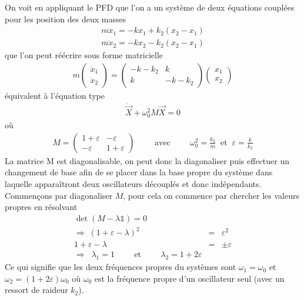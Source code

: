 \documentclass[12pt,prb,aps,epsf]{article}
\begin{document}
On voit en appliquant le PFD que l'on a un système de deux équations couplées pour les position des deux masses
\begin{eqnarray}
m\ddot{x}_1 = -kx_1 + k_2(x_2-x_1)\\
m\ddot{x}_2 = -kx_2 - k_2(x_2-x_1)
\end{eqnarray}
que l'on peut réécrire sous forme matricielle 
\begin{eqnarray}
m
\begin{pmatrix}
\ddot{x}_1\\
\ddot{x}_2
\end{pmatrix}
= \begin{pmatrix}
- k - k_2& k\\
k & - k - k_2
\end{pmatrix}
\begin{pmatrix}
x_1\\
x_2
\end{pmatrix}
\end{eqnarray}
équivalent à l'équation type 
\begin{eqnarray}
\ddot{\vec{X}} + \omega_0^2 M\vec{X} = 0
\end{eqnarray}
où
\begin{eqnarray}
M = \begin{pmatrix}
1+\varepsilon & -\varepsilon\\
- \varepsilon & 1+ \varepsilon
\end{pmatrix}
\hspace{1cm}\mathrm{avec}\hspace{1cm} \omega_0^2 = \frac{k_2}{m}\;\;\mathrm{et}\;\; \varepsilon = \frac{k}{k_2}
\end{eqnarray}
La matrice M est diagonalisable, on peut donc la diagonaliser puis effectuer un changement de base afin de se placer dans la base propre du système dans laquelle apparaîtront deux oscillateurs découplés et donc indépendants. Commençons par diagonaliser $M$, pour cela on commence par chercher les valeurs propres en résolvant 
\begin{eqnarray}
\det(M - \lambda \mathbb{1}) = 0\\
\Rightarrow\; (1+\varepsilon-\lambda)^2 &=& \varepsilon^2\\
1 + \varepsilon - \lambda &=& \pm \varepsilon\\
\Rightarrow\;\;\lambda_1 = 1\hspace{1cm}\mathrm{et}\hspace{1cm}\lambda_2 = 1+2\varepsilon
\end{eqnarray}
Ce qui signifie que les deux fréquences propres du systèmes sont $\omega_1 = \omega_0$ et $\omega_2 = (1+2\varepsilon)\omega_0$ où $\omega_0$ est la fréquence propre d'un oscillateur seul (avec un ressort de raideur $k_2$).\\
\end{document}
